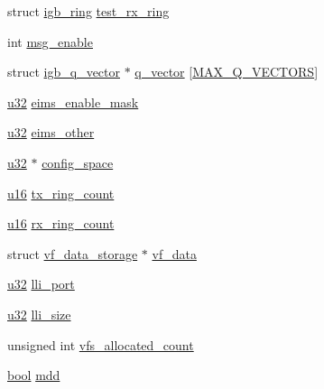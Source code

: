 \begin{DoxyCompactItemize}
\item 
struct \hyperlink{structigb__ring}{igb\+\_\+ring} \hyperlink{structigb__adapter_a0c0089b2b72b329e955bfa3d6a4d50d5}{test\+\_\+rx\+\_\+ring}
\item 
int \hyperlink{structigb__adapter_aa31191614969a918cd81decb15c6b9dd}{msg\+\_\+enable}
\item 
struct \hyperlink{structigb__q__vector}{igb\+\_\+q\+\_\+vector} $\ast$ \hyperlink{structigb__adapter_a5853a9971831230abae4ae9a1afc0c0b}{q\+\_\+vector} \mbox{[}\hyperlink{kmod_2igb_2igb_8h_ae8e0927671791217822a13bcfbae7950}{M\+A\+X\+\_\+\+Q\+\_\+\+V\+E\+C\+T\+O\+RS}\mbox{]}
\item 
\hyperlink{lib_2igb_2e1000__osdep_8h_a64e91c10a0d8fb627e92932050284264}{u32} \hyperlink{structigb__adapter_a4a7e158c8d93b26d1caf1936dc15a269}{eims\+\_\+enable\+\_\+mask}
\item 
\hyperlink{lib_2igb_2e1000__osdep_8h_a64e91c10a0d8fb627e92932050284264}{u32} \hyperlink{structigb__adapter_abf76408eafd71916cf6850fb3b1e7379}{eims\+\_\+other}
\item 
\hyperlink{lib_2igb_2e1000__osdep_8h_a64e91c10a0d8fb627e92932050284264}{u32} $\ast$ \hyperlink{structigb__adapter_a514833e31e1159a00fdd0626a47220aa}{config\+\_\+space}
\item 
\hyperlink{lib_2igb_2e1000__osdep_8h_acdc9cf0314be0ae5a01d6d4379a95edd}{u16} \hyperlink{structigb__adapter_ade2d7a11c2efc594d1b4c64ed24813bb}{tx\+\_\+ring\+\_\+count}
\item 
\hyperlink{lib_2igb_2e1000__osdep_8h_acdc9cf0314be0ae5a01d6d4379a95edd}{u16} \hyperlink{structigb__adapter_a8cbee0f507afaaabb0f916510c26be42}{rx\+\_\+ring\+\_\+count}
\item 
struct \hyperlink{structvf__data__storage}{vf\+\_\+data\+\_\+storage} $\ast$ \hyperlink{structigb__adapter_a64f983b74b075dff5aacd4c5bd24dff7}{vf\+\_\+data}
\item 
\hyperlink{lib_2igb_2e1000__osdep_8h_a64e91c10a0d8fb627e92932050284264}{u32} \hyperlink{structigb__adapter_a28be73f7fefebf3f4de8b5b0c143b895}{lli\+\_\+port}
\item 
\hyperlink{lib_2igb_2e1000__osdep_8h_a64e91c10a0d8fb627e92932050284264}{u32} \hyperlink{structigb__adapter_a2316241ef54e8be665bac12c9da109c8}{lli\+\_\+size}
\item 
unsigned int \hyperlink{structigb__adapter_a2a0001d0468c7817f65c61ef6a6f4fa4}{vfs\+\_\+allocated\+\_\+count}
\item 
\hyperlink{avb__gptp_8h_af6a258d8f3ee5206d682d799316314b1}{bool} \hyperlink{structigb__adapter_a0a2ce3d164da662fb8f57459c298a1f6}{mdd}

\end{DoxyCompactItemize}

